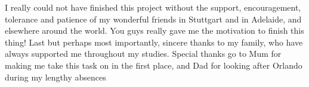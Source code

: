 I really could not have finished this project without the support, encouragement, tolerance and patience of my wonderful friends in Stuttgart and in Adelaide, and elsewhere around the world. You guys really gave me the motivation to finish this thing! Last but perhaps most importantly, sincere thanks to my family, who have always supported me throughout my studies. Special thanks go to Mum for making me take this task on in the first place, and Dad for looking after Orlando during my lengthy absences\includegraphics[height=0.5mm]{images/homer_simpson.pdf}